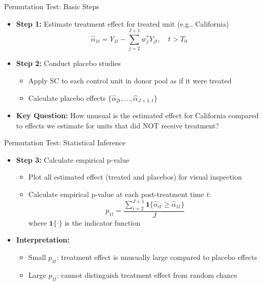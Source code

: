 \documentclass[hyperref={pdfpagelabels=false}]{beamer}
\begin{document}
\begin{frame}{Permutation Test: Basic Steps}
	\begin{itemize}
		\item \textbf{Step 1:} Estimate treatment effect for treated unit (e.g., California)
		\begin{equation*}
			\hat{\alpha}_{1t} = Y_{1t} - \sum_{j=2}^{J+1} w_j^* Y_{jt}, \quad t > T_0
\end{equation*}
		\vspace{0.2cm}
		\item \textbf{Step 2:} Conduct placebo studies
				\vspace{0.2cm}
		\begin{itemize}
			\item Apply SC to each control unit in donor pool as if it were treated
					\vspace{0.2cm}
			\item Calculate placebo effects $\{\hat{\alpha}_{2t},...,\hat{\alpha}_{J+1,t}\}$
		\end{itemize}
		\vspace{0.2cm}
		\item \textbf{Key Question:} How unusual is the estimated effect for California compared to effects we estimate for units that did NOT receive treatment?
	\end{itemize}
\end{frame}

\begin{frame}{Permutation Test: Statistical Inference}
	\begin{itemize}
		\item \textbf{Step 3:} Calculate empirical p-value
		\begin{itemize}
			\item Plot all estimated effect (treated and placebos) for visual inspection
			\vspace{0.2cm}
			\item Calculate empirical p-value at each post-treatment time $t$:
			\begin{equation*}
				p_{1t}=\dfrac{\sum^{J+1}_{i=2}\mathbf{1}\{\hat{\alpha}_{it}\geq\hat{\alpha}_{1t}\}}{J}
\end{equation*}
			where $\mathbf{1}\{\cdot\}$ is the indicator function
		\end{itemize}
		\vspace{0.2cm}
		\item \textbf{Interpretation:} 
		\begin{itemize}
			\item Small $p_{1t}$: treatment effect is unusually large compared to placebo effects
					\vspace{0.2cm}
			\item Large $p_{1t}$: cannot distinguish treatment effect from random chance
		\end{itemize}
	\end{itemize}
\end{frame}
\end{document}
